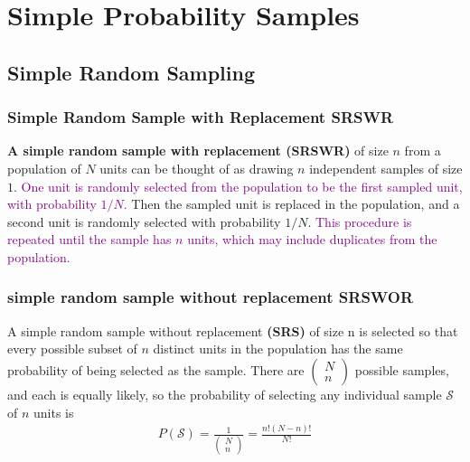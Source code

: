 \documentclass[a4paper,twoside,11pt]{article}
\begin{document}
\section{Simple Probability Samples}
\subsection{Simple Random Sampling}
\subsubsection{Simple Random Sample with Replacement SRSWR}
\textbf{A simple random sample with replacement (SRSWR)} of size $n$ from a population of $N$ units can be thought of as drawing $n$ independent samples of size $1$. \textcolor{Purple}{One unit is randomly selected from the population to be the first sampled unit, with probability $1/N$.} Then the sampled unit is replaced in the population, and a second unit is randomly selected with probability $1/N$. \textcolor{Purple}{This procedure is repeated until the sample has $n$ units, which may include duplicates from the population.}
\subsubsection{simple random sample without replacement SRSWOR}
A simple random sample without replacement \textbf{(SRS)} of size n is selected so that every possible subset of $n$ distinct units in the population has the same probability of being selected as the sample. There are $\begin{pmatrix} N \\ n \end{pmatrix}$ possible samples, and each is equally likely, so the probability of selecting any individual sample $\mathcal{S}$ of $n$ units is
\begin{equation*}
\begin{aligned}
P(\mathcal{S}) = \frac{1}{\begin{pmatrix} N \\ n \end{pmatrix} } = \frac{n!(N-n)!}{N!}
\end{aligned}
\end{equation*}
\end{document}
